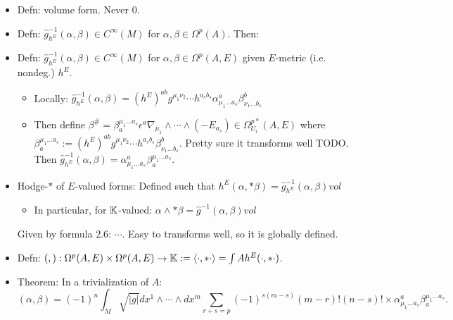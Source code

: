 {\begin{itemize}
        \begin{itemize}
            
        \item Defn: volume form. Never $0$.
        
        \item Defn: $\hat g^{-1}_{h^E}(\alpha, \beta) \in C^\infty(M)$ for $\alpha, \beta \in  \Omega^p(A)$. Then:
        
        \item Defn: $\hat g^{-1}_{h^E}(\alpha, \beta) \in C^\infty(M)$ for $\alpha, \beta \in \Omega^p(A, E)$ given $E$-metric (i.e. nondeg.) $h^E$.
        
            \begin{itemize}
                
            \item Locally: $\hat g^{-1}_{h^E}(\alpha, \beta) = (h^E)^{ab} g^{\mu_1 \nu_2} \cdots h^{a_s b_s} \alpha^a_{\mu_1 \dots a_s} \beta^b_{\nu_1 \dots b_s} $ 
            
            \item Then define $\beta^\# = \beta_a^{\mu_1 \dots a_s} \epsilon^a \nabla_{\mu_1}\wedge \cdots \wedge (-E_{a_s}) \in \Omega^{p*}_{U_i}(A, E)$ where $\beta_a^{\mu_1 \dots a_s} := (h^E)^{ab} g^{\mu_1 \nu_2} \cdots h^{a_s b_s} \beta^b_{\nu_1 \dots b_s}$. Pretty sure it transforms well TODO. Then $\hat g^{-1}_{h^E}(\alpha, \beta) = \alpha^a_{\mu_1 \dots a_s} \beta_a^{\mu_1 \dots a_s}$.
                
            \end{itemize}
        
        \item Hodge-$*$ of $E$-valued forms: Defined such that $h^E(\alpha, *\beta) = \hat g^{-1}_{h^E}(\alpha, \beta) vol$
        
            \begin{itemize}
                
            \item In particular, for $\mathbb{K}$-valued: $\alpha \wedge *\beta =\hat g^{-1}(\alpha, \beta) vol$
                
            \end{itemize}
        Given by formula $2.6$: $\cdots$. Easy to transforms well, so it is globally defined.
        
        \item Defn: $(,): \Omega^p(A, E) \times \Omega^p(A, E) \to \mathbb{K} := \langle \cdot , * \cdot \rangle = \int A h^E(\cdot, * \cdot)$.
        
        \item Theorem: In a trivialization of $A$:
        \begin{equation}
            (\alpha, \beta) = (-1)^n \int_M \sqrt{|g|} dx^1 \wedge \cdots \wedge dx^m \sum_{r + s = p} (-1)^{s(m-s)} (m-r)! (n-s)! \times \alpha^a_{\mu_1 \dots a_s} \beta_a^{\mu_1 \dots a_s}.
        \end{equation}
            
        \end{itemize}
        
    \end{itemize}

}

